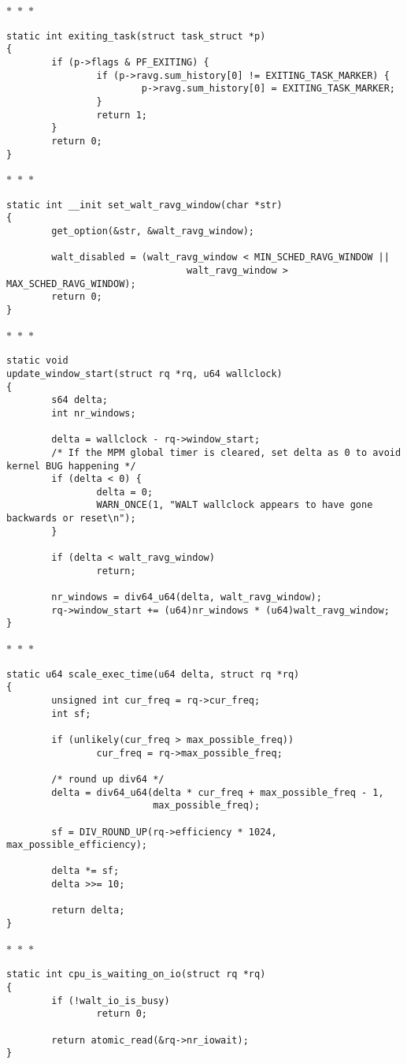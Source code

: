 \documentclass{article}
\newcommand{\divider}{{\begin{center}
  $\ast$~$\ast$~$\ast$
\end{center}}}
\begin{document}
\divider
\begin{verbatim}
static int exiting_task(struct task_struct *p)
{
        if (p->flags & PF_EXITING) {
                if (p->ravg.sum_history[0] != EXITING_TASK_MARKER) {
                        p->ravg.sum_history[0] = EXITING_TASK_MARKER;
                }
                return 1;
        }
        return 0;
}
\end{verbatim}
\divider
\begin{verbatim}
static int __init set_walt_ravg_window(char *str)
{
        get_option(&str, &walt_ravg_window);

        walt_disabled = (walt_ravg_window < MIN_SCHED_RAVG_WINDOW ||
                                walt_ravg_window > MAX_SCHED_RAVG_WINDOW);
        return 0;
}
\end{verbatim}
\divider
\begin{verbatim}
static void
update_window_start(struct rq *rq, u64 wallclock)
{
        s64 delta;
        int nr_windows;

        delta = wallclock - rq->window_start;
        /* If the MPM global timer is cleared, set delta as 0 to avoid kernel BUG happening */
        if (delta < 0) {
                delta = 0;
                WARN_ONCE(1, "WALT wallclock appears to have gone backwards or reset\n");
        }

        if (delta < walt_ravg_window)
                return;

        nr_windows = div64_u64(delta, walt_ravg_window);
        rq->window_start += (u64)nr_windows * (u64)walt_ravg_window;
}
\end{verbatim}
\divider
\begin{verbatim}
static u64 scale_exec_time(u64 delta, struct rq *rq)
{
        unsigned int cur_freq = rq->cur_freq;
        int sf;

        if (unlikely(cur_freq > max_possible_freq))
                cur_freq = rq->max_possible_freq;

        /* round up div64 */
        delta = div64_u64(delta * cur_freq + max_possible_freq - 1,
                          max_possible_freq);

        sf = DIV_ROUND_UP(rq->efficiency * 1024, max_possible_efficiency);
        
        delta *= sf;
        delta >>= 10;

        return delta;
}
\end{verbatim}
\divider
\begin{verbatim}
static int cpu_is_waiting_on_io(struct rq *rq)
{
        if (!walt_io_is_busy)
                return 0;

        return atomic_read(&rq->nr_iowait);
}
\end{verbatim}
\end{document}
